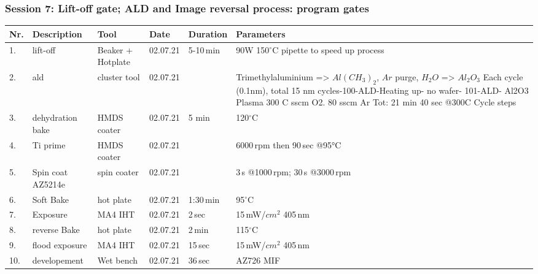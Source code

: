 \vspace{-0.1cm}
\subsubsection*{Session 7: Lift-off gate; ALD and Image reversal process: program gates}     
\vspace{-0.5cm}   
\begin{table}[H]
\footnotesize
\begin{tabular}{| p{0.4cm}| p{4.0cm}| p{3.0cm}|p{2.0cm}| p{2.0cm}|p{13.5cm}|}
\hline
\textbf{Nr.}&\textbf{Description} &\textbf{Tool}& \textbf{Date}  &\textbf{Duration} & \textbf{Parameters}\\ \hline\hline
1. &lift-off& Beaker + Hotplate&02.07.21 & 5-10\,min & 90W 150$^{\circ}$C pipette to speed up process\\\hline
2. &ald& cluster tool&02.07.21 &  & Trimethylaluminium => $Al(CH_3)_2$, $Ar$ purge, $H_2O$ => $Al_2O_3$ \newline
Each cycle (0.1nm), total 15 nm\newline
150 cycles\newline
1-100-ALD-Heating up- no wafer\newline
2- 101-ALD- Al2O3 Plasma 300 C\newline
60 sscm O2. 80 sscm Ar\newline
Tot: 21 min 40 sec @300C\newline
150 Cycle\newline
607 steps\\\hline
3. &dehydration bake& HMDS coater&02.07.21 & 5 min & 120$^{\circ}$C  \\\hline
4. &Ti prime& HMDS coater&02.07.21 &  & 6000\,rpm then 90\,sec @95°C  \\\hline
5. &Spin coat AZ5214e & spin coater&02.07.21 &  & 3\,s @1000\,rpm; 30\,s @3000\,rpm  \\\hline
6. &Soft Bake & hot plate&02.07.21 & 1:30\,min & 95$^{\circ}$C  \\\hline
7. &Exposure & MA4 IHT&02.07.21 & 2\,sec & 15\,mW/$cm^2$ 405\,nm  \\\hline
8. &reverse Bake & hot plate&02.07.21 & 2\,min & 115$^{\circ}$C  \\\hline
9. &flood exposure & MA4 IHT&02.07.21 & 15\,sec & 15\,mW/$cm^2$ 405\,nm \\\hline
10. &developement & Wet bench&02.07.21 & 36\,sec & AZ726 MIF \\\hline
\end{tabular}
\end{table} 